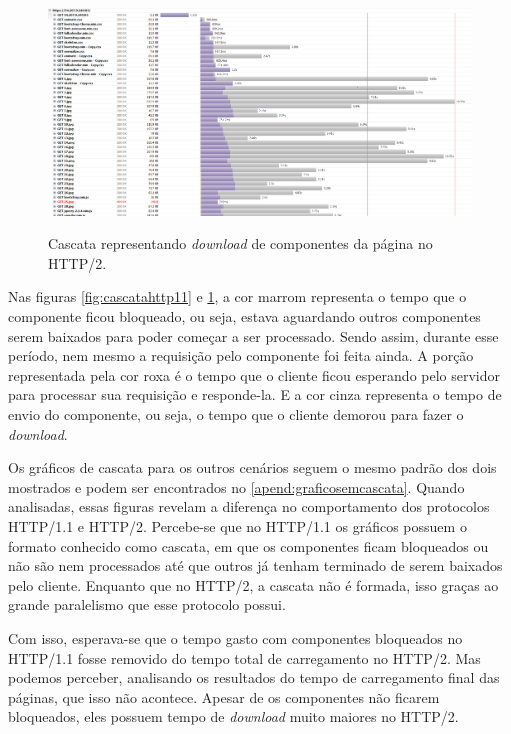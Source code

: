 \begin{landscape}
	\begin{figure}[!htbp]
    	\centering
	    \caption{Cascata representando \textit{download} de componentes da página no HTTP/2.}
    	\includegraphics[width=1.5\textwidth]{./04-figuras/analise-de-resultados/cascata_http2}
	    \label{fig:cascatahttp2}
	\end{figure}
\end{landscape}

Nas figuras \ref{fig:cascatahttp11} e \ref{fig:cascatahttp2}, a cor marrom representa o tempo que o componente ficou bloqueado, ou seja, estava aguardando outros componentes serem baixados para poder começar a ser processado. Sendo assim, durante esse período, nem mesmo a requisição pelo componente foi feita ainda. A porção representada pela cor roxa é o tempo que o cliente ficou esperando pelo servidor para processar sua requisição e responde-la. E a cor cinza representa o tempo de envio do componente, ou seja, o tempo que o cliente demorou para fazer o \textit{download}.

Os gráficos de cascata para os outros cenários seguem o mesmo padrão dos dois mostrados e podem ser encontrados no \autoref{apend:graficosemcascata}. Quando analisadas, essas figuras revelam a diferença no comportamento dos protocolos HTTP/1.1 e HTTP/2. Percebe-se que no HTTP/1.1 os gráficos possuem o formato conhecido como cascata, em que os componentes ficam bloqueados ou não são nem processados até que outros já tenham terminado de serem baixados pelo cliente. Enquanto que no HTTP/2, a cascata não é formada, isso graças ao grande paralelismo que esse protocolo possui.

Com isso, esperava-se que o tempo gasto com componentes bloqueados no HTTP/1.1 fosse removido do tempo total de carregamento no HTTP/2. Mas podemos perceber, analisando os resultados do tempo de carregamento final das páginas, que isso não acontece. Apesar de os componentes não ficarem bloqueados, eles possuem tempo de \textit{download} muito maiores no HTTP/2.

